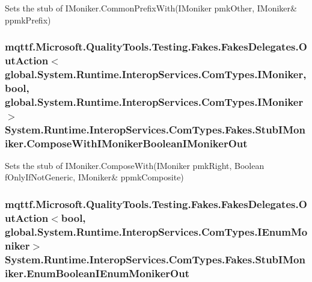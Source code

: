 Sets the stub of I\-Moniker.\-Common\-Prefix\-With(I\-Moniker pmk\-Other, I\-Moniker\& ppmk\-Prefix)

\hypertarget{class_system_1_1_runtime_1_1_interop_services_1_1_com_types_1_1_fakes_1_1_stub_i_moniker_a6f8749b4070371d126216c88ccc2ce74}{
\subsubsection[{Compose\-With\-I\-Moniker\-Boolean\-I\-Moniker\-Out}]{\setlength{\rightskip}{0pt plus 5cm}mqttf.\-Microsoft.\-Quality\-Tools.\-Testing.\-Fakes.\-Fakes\-Delegates.\-Out\-Action$<$global.\-System.\-Runtime.\-Interop\-Services.\-Com\-Types.\-I\-Moniker, bool, global.\-System.\-Runtime.\-Interop\-Services.\-Com\-Types.\-I\-Moniker$>$ System.\-Runtime.\-Interop\-Services.\-Com\-Types.\-Fakes.\-Stub\-I\-Moniker.\-Compose\-With\-I\-Moniker\-Boolean\-I\-Moniker\-Out}}\label{class_system_1_1_runtime_1_1_interop_services_1_1_com_types_1_1_fakes_1_1_stub_i_moniker_a6f8749b4070371d126216c88ccc2ce74}


Sets the stub of I\-Moniker.\-Compose\-With(I\-Moniker pmk\-Right, Boolean f\-Only\-If\-Not\-Generic, I\-Moniker\& ppmk\-Composite)

\hypertarget{class_system_1_1_runtime_1_1_interop_services_1_1_com_types_1_1_fakes_1_1_stub_i_moniker_a6a5162c4c68cc1e184cf943136dd4578}{
\subsubsection[{Enum\-Boolean\-I\-Enum\-Moniker\-Out}]{\setlength{\rightskip}{0pt plus 5cm}mqttf.\-Microsoft.\-Quality\-Tools.\-Testing.\-Fakes.\-Fakes\-Delegates.\-Out\-Action$<$bool, global.\-System.\-Runtime.\-Interop\-Services.\-Com\-Types.\-I\-Enum\-Moniker$>$ System.\-Runtime.\-Interop\-Services.\-Com\-Types.\-Fakes.\-Stub\-I\-Moniker.\-Enum\-Boolean\-I\-Enum\-Moniker\-Out}}\label{class_system_1_1_runtime_1_1_interop_services_1_1_com_types_1_1_fakes_1_1_stub_i_moniker_a6a5162c4c68cc1e184cf943136dd4578}


